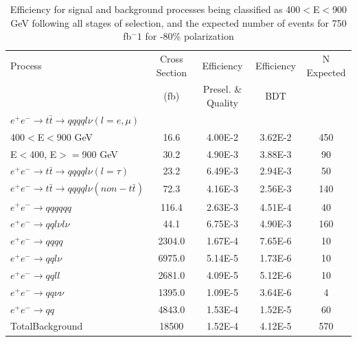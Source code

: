 \begin{table}
  \centering
  \begin{tabular}{l | c | c | c | c}
    \toprule
     Process     & Cross Section & Efficiency & Efficiency & N Expected\\
     & (fb) & Presel. \& Quality & BDT & \\
     \midrule
    $e^+e^-\rightarrow t\bar{t} \rightarrow qqqql\nu (l=e,\mu)$&  &  & &\\
    400$<$E$<$900 GeV & 16.6 & 4.00E-2 & 3.62E-2 & 450\\
    E$<$400, E$>=$900 GeV & 30.2 & 4.90E-3 & 3.88E-3 & 90\\
    \midrule
    $e^+e^-\rightarrow t\bar{t} \rightarrow qqqql\nu (l=\tau)$& 23.2 & 6.49E-3 & 2.94E-3 & 50 \\
    \midrule
    $e^+e^-\rightarrow t\bar{t} \rightarrow qqqql\nu (non-t\bar{t})$& 72.3 & 4.16E-3 & 2.56E-3 & 140\\
    \midrule
    $e^+e^-\rightarrow qqqqqq$ & 116.4 & 2.63E-3 & 4.51E-4 & 40 \\
    \midrule
    $e^+e^-\rightarrow qql\nu l\nu$ & 44.1 & 6.75E-3 & 4.90E-3 & 160\\
    \midrule
    $e^+e^-\rightarrow qqqq$ & 2304.0 & 1.67E-4 & 7.65E-6 & 10 \\
    \midrule
    $e^+e^-\rightarrow qql\nu$ & 6975.0 & 5.14E-5 & 1.73E-6 & 10 \\
    \midrule
    $e^+e^-\rightarrow qqll$ & 2681.0 & 4.09E-5 & 5.12E-6 & 10 \\
    \midrule
    $e^+e^-\rightarrow qq\nu\nu$ & 1395.0 & 1.09E-5 & 3.64E-6 & 4 \\
    \midrule
    $e^+e^-\rightarrow qq$ & 4843.0 & 1.53E-4 & 1.52E-5 & 60\\
    \midrule
    \midrule
    TotalBackground & 18500 & 1.52E-4 & 4.12E-5 & 570  \\
    \bottomrule
  \end{tabular}
  \caption{Efficiency for signal and background processes being classified as 400$<$E$<$900 GeV following all stages of selection, and the expected number of events for 750 fb$^-1$ for -80\% polarization}
  \label{table:topfinalefficienciesnegLowE}
\end{table}

